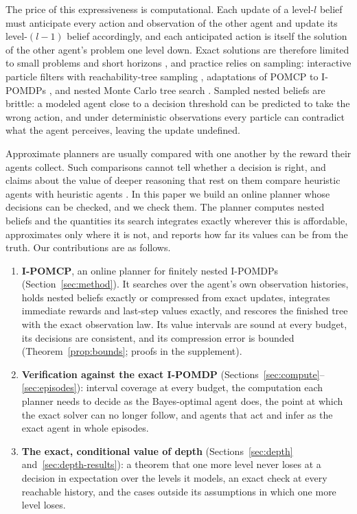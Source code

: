 \documentclass{article}
\begin{document}
The price of this expressiveness is computational. Each update of a level-$l$ belief must anticipate every action and observation of the other agent and update its level-$(l-1)$ belief accordingly, and each anticipated action is itself the solution of the other agent's problem one level down. Exact solutions are therefore limited to small problems and short horizons \cite{rathnasabapathy2006exact}, and practice relies on sampling: interactive particle filters with reachability-tree sampling \cite{doshi2009monte}, adaptations of POMCP \cite{silver2010monte} to I-POMDPs \cite{hula2015monte}, and nested Monte Carlo tree search \cite{schwartz2022online}. Sampled nested beliefs are brittle: a modeled agent close to a decision threshold can be predicted to take the wrong action, and under deterministic observations every particle can contradict what the agent perceives, leaving the update undefined.

Approximate planners are usually compared with one another by the reward their agents collect. Such comparisons cannot tell whether a decision is right, and claims about the value of deeper reasoning that rest on them compare heuristic agents with heuristic agents \cite{deweerd2013much,deweerd2022higher}. In this paper we build an online planner whose decisions can be checked, and we check them. The planner computes nested beliefs and the quantities its search integrates exactly wherever this is affordable, approximates only where it is not, and reports how far its values can be from the truth. Our contributions are as follows.
\begin{enumerate}
    \item \textbf{I-POMCP}, an online planner for finitely nested I-POMDPs (Section~\ref{sec:method}). It searches over the agent's own observation histories, holds nested beliefs exactly or compressed from exact updates, integrates immediate rewards and last-step values exactly, and rescores the finished tree with the exact observation law. Its value intervals are sound at every budget, its decisions are consistent, and its compression error is bounded (Theorem~\ref{prop:bounds}; proofs in the supplement).
    \item \textbf{Verification against the exact I-POMDP} (Sections~\ref{sec:compute}--\ref{sec:episodes}): interval coverage at every budget, the computation each planner needs to decide as the Bayes-optimal agent does, the point at which the exact solver can no longer follow, and agents that act and infer as the exact agent in whole episodes.
    \item \textbf{The exact, conditional value of depth} (Sections~\ref{sec:depth} and~\ref{sec:depth-results}): a theorem that one more level never loses at a decision in expectation over the levels it models, an exact check at every reachable history, and the cases outside its assumptions in which one more level loses.
\end{enumerate}
\end{document}
